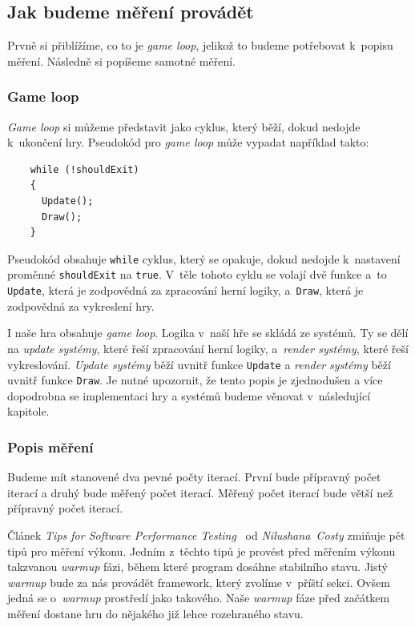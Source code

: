 \subsection{Jak budeme měření provádět}
Prvně si přiblížíme, co to je \textit{game loop}, jelikož to budeme potřebovat k~popisu měření. Následně si popíšeme samotné měření.

\subsubsection{Game loop}
\label{game-loop}
\textit{Game loop} si můžeme představit jako cyklus, který běží, dokud nedojde k~ukončení hry. Pseudokód pro \textit{game loop} může vypadat například takto:

\begin{verbatim}
    while (!shouldExit) 
    {
      Update();
      Draw();
    }
\end{verbatim}

Pseudokód obsahuje \texttt{while} cyklus, který se opakuje, dokud nedojde k~nastavení proměnné \texttt{shouldExit} na \texttt{true}. V~těle tohoto cyklu se volají dvě funkce a~to \texttt{Update}, která je zodpovědná za zpracování herní logiky, a~\texttt{Draw}, která je zodpovědná za vykreslení hry. 

I naše hra obsahuje \textit{game loop}. Logika v~naší hře se skládá ze systémů. Ty se dělí na \textit{update systémy}, které řeší zpracování herní logiky, a~\textit{render systémy}, které řeší vykreslování. \textit{Update systémy} běží uvnitř funkce \texttt{Update} a \textit{render systémy} běží uvnitř funkce \texttt{Draw}. Je nutné upozornit, že tento popis je zjednodušen a více dopodrobna se implementaci hry a systémů budeme věnovat v~následující kapitole.

\subsubsection{Popis měření}
Budeme mít stanovené dva pevné počty iterací. První bude přípravný počet iterací a druhý bude měřený počet iterací. Měřený počet iterací bude větší než přípravný počet iterací.

Článek \textit{Tips for Software Performance Testing}~\cite{PerformanceTips} od \textit{Nilushana~Costy} zmiňuje pět tipů pro měření výkonu. Jedním z~těchto tipů je provést před měřením výkonu takzvanou \textit{warmup} fázi, během které program dosáhne stabilního stavu. Jistý \textit{warmup} bude za nás provádět framework, který zvolíme v~příští sekci. Ovšem jedná se o~\textit{warmup} prostředí jako takového. Naše \textit{warmup} fáze před začátkem měření dostane hru do nějakého již lehce rozehraného stavu.

